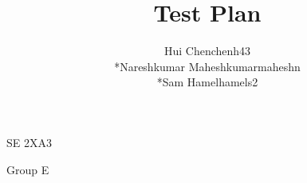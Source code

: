 \documentclass[12pt]{article}
\begin{document}
	\begin{titlepage}
	\title {Test Plan}
	\maketitle
		\begin{center}
		SE 2XA3\\
		\author{
		Hui Chen\hspace{128pt}chenh43	
		\\*Nareshkumar Maheshkumar\hspace{35pt}maheshn 
		\\*Sam Hamel\hspace{118pt}hamels2 \\
		}

		Group E
		\end{center}
	\end{titlepage}
	\newpage
\end{document}
